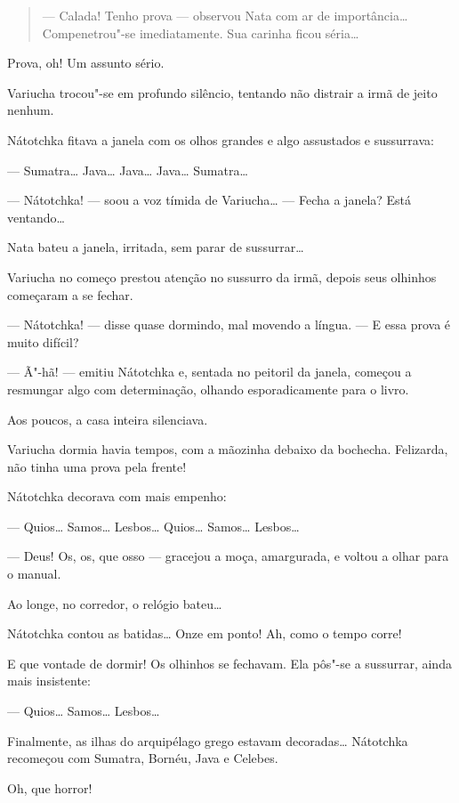 \begin{quote}
--- Calada! Tenho prova --- observou Nata com ar de importância\ldots{}
Compenetrou"-se imediatamente. Sua carinha ficou séria\ldots{}
\end{quote}

Prova, oh! Um assunto sério.

Variucha trocou"-se em profundo silêncio, tentando não distrair a irmã de
jeito nenhum.

Nátotchka fitava a janela com os olhos grandes e algo assustados e
sussurrava:

--- Sumatra\ldots{} Java\ldots{} Java\ldots{} Java\ldots{} Sumatra\ldots{}

--- Nátotchka! --- soou a voz tímida de Variucha\ldots{} --- Fecha a janela?
Está ventando\ldots{}

Nata bateu a janela, irritada, sem parar de sussurrar\ldots{}

Variucha no começo prestou atenção no sussurro da irmã, depois seus
olhinhos começaram a se fechar.

--- Nátotchka! --- disse quase dormindo, mal movendo a língua. --- E
essa prova é muito difícil?

--- Ã"-hã! --- emitiu Nátotchka e, sentada no peitoril da janela, começou
a resmungar algo com determinação, olhando esporadicamente para o livro.

Aos poucos, a casa inteira silenciava.

Variucha dormia havia tempos, com a mãozinha debaixo da bochecha.
Felizarda, não tinha uma prova pela frente!

Nátotchka decorava com mais empenho:

--- Quios\ldots{} Samos\ldots{} Lesbos\ldots{} Quios\ldots{} Samos\ldots{} Lesbos\ldots{}

--- Deus! Os, os, que osso --- gracejou a moça,
amargurada, e voltou a olhar para o manual.

Ao longe, no corredor, o relógio bateu\ldots{}

Nátotchka contou as batidas\ldots{} Onze em ponto! Ah, como o tempo corre!

E que vontade de dormir! Os olhinhos se fechavam. Ela pôs"-se a
sussurrar, ainda mais insistente:

--- Quios\ldots{} Samos\ldots{} Lesbos\ldots{}

Finalmente, as ilhas do arquipélago grego estavam decoradas\ldots{} Nátotchka
recomeçou com Sumatra, Bornéu, Java e Celebes.

Oh, que horror!

